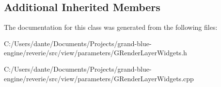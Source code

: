 \subsection*{Additional Inherited Members}


The documentation for this class was generated from the following files\+:\begin{DoxyCompactItemize}
\item 
C\+:/\+Users/dante/\+Documents/\+Projects/grand-\/blue-\/engine/reverie/src/view/parameters/G\+Render\+Layer\+Widgets.\+h\item 
C\+:/\+Users/dante/\+Documents/\+Projects/grand-\/blue-\/engine/reverie/src/view/parameters/G\+Render\+Layer\+Widgets.\+cpp\end{DoxyCompactItemize}
